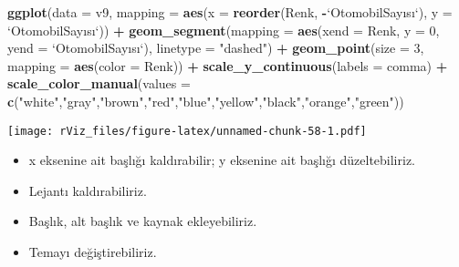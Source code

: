 \documentclass[
]{book}
\newenvironment{Shaded}{\begin{snugshade}}{\end{snugshade}}
\newcommand{\DataTypeTok}[1]{\textcolor[rgb]{0.13,0.29,0.53}{#1}}
\newcommand{\DecValTok}[1]{\textcolor[rgb]{0.00,0.00,0.81}{#1}}
\newcommand{\KeywordTok}[1]{\textcolor[rgb]{0.13,0.29,0.53}{\textbf{#1}}}
\newcommand{\NormalTok}[1]{#1}
\newcommand{\OperatorTok}[1]{\textcolor[rgb]{0.81,0.36,0.00}{\textbf{#1}}}
\newcommand{\StringTok}[1]{\textcolor[rgb]{0.31,0.60,0.02}{#1}}
\begin{document}
\begin{Shaded}
\begin{Highlighting}[]
\KeywordTok{ggplot}\NormalTok{(}\DataTypeTok{data =}\NormalTok{ v9, }\DataTypeTok{mapping =} \KeywordTok{aes}\NormalTok{(}\DataTypeTok{x =} \KeywordTok{reorder}\NormalTok{(Renk, }\OperatorTok{-}\StringTok{`}\DataTypeTok{OtomobilSayısı}\StringTok{`}\NormalTok{), }\DataTypeTok{y =} \StringTok{`}\DataTypeTok{OtomobilSayısı}\StringTok{`}\NormalTok{)) }\OperatorTok{+}
\StringTok{  }\KeywordTok{geom_segment}\NormalTok{(}\DataTypeTok{mapping =} \KeywordTok{aes}\NormalTok{(}\DataTypeTok{xend =}\NormalTok{ Renk, }\DataTypeTok{y =} \DecValTok{0}\NormalTok{, }\DataTypeTok{yend =} \StringTok{`}\DataTypeTok{OtomobilSayısı}\StringTok{`}\NormalTok{), }\DataTypeTok{linetype =} \StringTok{"dashed"}\NormalTok{) }\OperatorTok{+}
\StringTok{  }\KeywordTok{geom_point}\NormalTok{(}\DataTypeTok{size =} \DecValTok{3}\NormalTok{, }\DataTypeTok{mapping =} \KeywordTok{aes}\NormalTok{(}\DataTypeTok{color =}\NormalTok{ Renk)) }\OperatorTok{+}
\StringTok{  }\KeywordTok{scale_y_continuous}\NormalTok{(}\DataTypeTok{labels =}\NormalTok{ comma) }\OperatorTok{+}
\StringTok{  }\KeywordTok{scale_color_manual}\NormalTok{(}\DataTypeTok{values =} \KeywordTok{c}\NormalTok{(}\StringTok{"white"}\NormalTok{,}\StringTok{"gray"}\NormalTok{,}\StringTok{"brown"}\NormalTok{,}\StringTok{"red"}\NormalTok{,}\StringTok{"blue"}\NormalTok{,}\StringTok{"yellow"}\NormalTok{,}\StringTok{"black"}\NormalTok{,}\StringTok{"orange"}\NormalTok{,}\StringTok{"green"}\NormalTok{))}
\end{Highlighting}
\end{Shaded}

\texttt{[image: rViz\_files/figure-latex/unnamed-chunk-58-1.pdf]}

\begin{itemize}
\item
  x eksenine ait başlığı kaldırabilir; y eksenine ait başlığı düzeltebiliriz.
\item
  Lejantı kaldırabiliriz.
\item
  Başlık, alt başlık ve kaynak ekleyebiliriz.
\item
  Temayı değiştirebiliriz.
\end{itemize}
\end{document}
